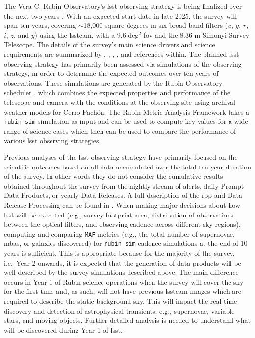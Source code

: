 \documentclass[preprintm,linenumbers]{aastex631}
\newcommand{\rubinsim}{\texttt{rubin\_sim}\xspace}
\newcommand{\maf}{\texttt{MAF}\xspace}
\begin{document}
	The Vera C. Rubin Observatory's \gls*{lsst} observing strategy is being finalized over the next two years \citep{SCOC_Report_1,SCOC_Report_2,SCOC_Report_3}. 
 With an expected start date in late 2025, the survey will span ten years, covering $\sim$18,000 square degrees in six broad-band filters ($u$, $g$, $r$, $i$, $z$, and $y$) using the \gls*{lsstcam}, with a 9.6 deg$^2$ \gls*{fov} and the 8.36-m Simonyi Survey Telescope. The details of the survey's main science drivers and science requirements are summarized by \cite{lsstScienceBook2009}, \cite{lsstSRD}, \cite{2019ApJ...873..111I}, \cite{2022ApJS..258....1B}, and references within. 
 The planned \gls*{lsst} observing strategy has primarily been assessed via simulations of the observing strategy, in order to determine the expected outcomes over ten years of observations.
 These simulations are generated by the Rubin Observatory scheduler \citep[\rubinsim;][]{2014SPIE.9150E..14C, 2014SPIE.9150E..15D, 2017arXiv170804058L, 2019AJ....157..151N, jones_r_lynne_2020_4048838}, which combines the expected properties and performance of the telescope and camera with the conditions at the observing site using archival weather models for Cerro Pach\'on. 
 The Rubin Metric Analysis Framework \citep[\maf; ][]{2014SPIE.9149E..0BJ} takes a \rubinsim simulation as input and can be used to compute key values for a wide range of science cases which then can be used to compare the performance of various \gls*{lsst} observing strategies.
	
	Previous analyses of the \gls*{lsst} observing strategy  \cite[e.g., ][]{lsstsciencecollaborationScienceDrivenOptimizationLSST2017, 2018Icar..303..181J,  2018arXiv181200515L, 2022ApJS..258....5A, 2022ApJS..263...23G, schwambTuningLegacySurvey2023,2023ApJS..268...11F} have primarily focused on the scientific outcomes based on all data accumulated over the total ten-year duration of the survey. In other words they do not consider the cumulative results obtained throughout the survey from the nightly stream of alerts, daily Prompt Data Products, or yearly Data Releases.
 A full description of the \gls*{rpp} and Data Release Processing can be found in \cite{LSE-163}.  
 When making major decisions about how \gls*{lsst} will be executed (e.g., survey footprint area, distribution of observations between the optical filters, and observing cadence across different sky regions), computing and comparing \maf metrics (e.g., the total number of supernovae, \glspl*{mba}, or galaxies discovered) for \rubinsim cadence simulations at the end of 10 years is sufficient. 
 This is appropriate because for the majority of the survey, i.e.\ Year 2 onwards, it is expected that the generation of data products will be well described by the survey simulations described above.
 The main difference occurs in Year 1 of Rubin science operations when the survey will cover the sky for the first time and, as such, will not have previous \gls*{lsstcam} images which are required to describe the static background sky. This will impact the real-time discovery and detection of astrophysical transients; e.g., supernovae, variable stars, and moving objects. Further detailed analysis is needed to understand what will be discovered during Year 1 of \gls*{lsst}. 
	
\end{document}

